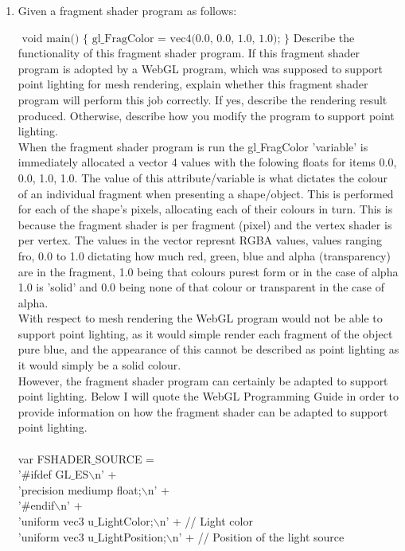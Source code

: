 \documentclass{mm2}
\begin{document}
\begin{enumerate}
\item Given a fragment shader program as follows:

$ \text{ void main() } \{ \text{ gl\_FragColor = vec4(0.0, 0.0, 1.0, 1.0); } \} $
Describe the functionality of this fragment shader program. If this fragment shader program is adopted by a WebGL program, which was supposed to support point lighting for mesh rendering, explain whether this fragment shader program will perform this job correctly. If yes, describe the rendering result produced. Otherwise, describe how you modify the program to support point lighting.\\

When the fragment shader program is run the gl$\_$FragColor 'variable' is immediately allocated a vector 4 values with the folowing floats for items 0.0, 0.0, 1.0, 1.0. The value of this attribute/variable is what dictates the colour of an individual fragment when presenting a shape/object. This is performed for each of the shape's pixels, allocating each of their colours in turn. This is because the fragment shader is per fragment (pixel) and the vertex shader is per vertex. The values in the vector represnt RGBA values, values ranging fro, 0.0 to 1.0 dictating how much red, green, blue and alpha (transparency) are in the fragment, 1.0 being that colours purest form or in the case of alpha 1.0 is 'solid' and 0.0 being none of that colour or transparent in the case of alpha.\\
With respect to mesh rendering the WebGL program would not be able to support point lighting, as it would simple render each fragment of the object pure blue, and the appearance of this cannot be described as point lighting as it would simply be a solid colour.\\
However, the fragment shader program can certainly be adapted to support point lighting. Below I will quote the WebGL Programming Guide in order to provide information on how the fragment shader can be adapted to support point lighting.\\
\\
var FSHADER$\_$SOURCE =\\
'$\#$ifdef GL$\_$ES$\backslash$n' +\\
'precision mediump float;$\backslash$n' +\\
'$\#$endif$\backslash$n' +\\
'uniform vec3 u$\_$LightColor;$\backslash$n' +    // Light color\\
'uniform vec3 u$\_$LightPosition;$\backslash$n' +  // Position of the light source\\

\end{enumerate}
\end{document}
